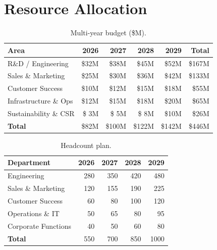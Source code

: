 \documentclass[
    language=english,
    doctype=strategic-plan,
    institution=none,
]{../../omnilatex}
\begin{document}
\section{Resource Allocation}
\begin{table}[htbp]
\centering\small
\begin{tabular}{lrrrrr}
    \toprule
    \textbf{Area} & \textbf{2026} & \textbf{2027} & \textbf{2028} & \textbf{2029} & \textbf{Total} \\
    \midrule
    R\&D / Engineering    & \$32M & \$38M & \$45M & \$52M & \$167M \\
    Sales \& Marketing    & \$25M & \$30M & \$36M & \$42M & \$133M \\
    Customer Success      & \$10M & \$12M & \$15M & \$18M & \$55M  \\
    Infrastructure \& Ops & \$12M & \$15M & \$18M & \$20M & \$65M  \\
    Sustainability \& CSR & \$ 3M & \$ 5M & \$ 8M & \$10M & \$26M  \\
    \midrule
    \textbf{Total}        & \$82M & \$100M & \$122M & \$142M & \$446M \\
    \bottomrule
\end{tabular}
\caption{Multi-year budget (\$M).}
\end{table}
\begin{table}[htbp]
\centering\small
\begin{tabular}{lrrrr}
    \toprule
    \textbf{Department} & \textbf{2026} & \textbf{2027} & \textbf{2028} & \textbf{2029} \\
    \midrule
    Engineering          & 280 & 350 & 420 & 480 \\
    Sales \& Marketing   & 120 & 155 & 190 & 225 \\
    Customer Success     &  60 &  80 & 100 & 120 \\
    Operations \& IT     &  50 &  65 &  80 &  95 \\
    Corporate Functions  &  40 &  50 &  60 &  80 \\
    \midrule
    \textbf{Total}       & 550 & 700 & 850 & 1000 \\
    \bottomrule
\end{tabular}
\caption{Headcount plan.}
\end{table}
\end{document}
